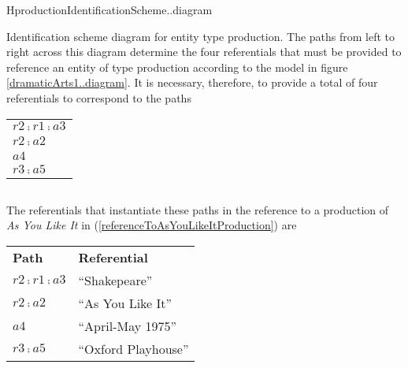\begin{erboxedFigure}{H}{productionIdentificationScheme..diagram}
{Identification scheme diagram for entity type production. 
The paths from left to right across this diagram determine the four referentials 
that must be provided to reference an entity of type production
according to the model in figure \ref{dramaticArts1..diagram}.
It is necessary, therefore,  to provide a total of four referentials
to correspond to the paths
\begin{center}
\begin{tabular}{p{3cm}}
$r2 \comp r1 \comp a3$ \\
$r2 \comp a2$ \\
$a4$          \\
$r3 \comp a5$ \\
\end{tabular}
\end{center}
}
 \begin{equation*}

\end{equation*}
\end{erboxedFigure}

The referentials that instantiate these paths in 
the reference to a production of 
\textit{As You Like It} in (\ref{referenceToAsYouLikeItProduction}) 
are\\
\newline
\begin{center}
\begin{tabular}{l l}
\textbf{Path}          & \textbf{Referential} \\
$r2 \comp r1 \comp a3$ & ``Shakepeare''       \\
$r2\comp a2$           & ``As You Like It''   \\
$a4$                   & ``April-May 1975''   \\
$r3 \comp a5$          & ``Oxford Playhouse''
\end{tabular}
\end{center}

